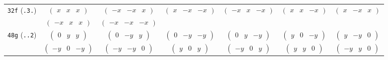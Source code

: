 \documentclass[fleqn,9pt,landscape]{jsarticle}
\begin{document}
\begin{center}
\begin{longtable}{ccccccc}
{\tt 32f} ({\tt .3.}) & $ \begin{pmatrix} x & x & x \end{pmatrix} $ & $ \begin{pmatrix} - x & - x & x \end{pmatrix} $ & $ \begin{pmatrix} x & - x & - x \end{pmatrix} $ & $ \begin{pmatrix} - x & x & - x \end{pmatrix} $ & $ \begin{pmatrix} x & x & - x \end{pmatrix} $ & $ \begin{pmatrix} x & - x & x \end{pmatrix} $ \\
& $ \begin{pmatrix} - x & x & x \end{pmatrix} $ & $ \begin{pmatrix} - x & - x & - x \end{pmatrix} $ & $  $ & $  $ & $  $ & $  $ \\ \hline
{\tt 48g} ({\tt ..2}) & $ \begin{pmatrix} 0 & y & y \end{pmatrix} $ & $ \begin{pmatrix} 0 & - y & y \end{pmatrix} $ & $ \begin{pmatrix} 0 & - y & - y \end{pmatrix} $ & $ \begin{pmatrix} 0 & y & - y \end{pmatrix} $ & $ \begin{pmatrix} y & 0 & - y \end{pmatrix} $ & $ \begin{pmatrix} y & - y & 0 \end{pmatrix} $ \\
& $ \begin{pmatrix} - y & 0 & - y \end{pmatrix} $ & $ \begin{pmatrix} - y & - y & 0 \end{pmatrix} $ & $ \begin{pmatrix} y & 0 & y \end{pmatrix} $ & $ \begin{pmatrix} - y & 0 & y \end{pmatrix} $ & $ \begin{pmatrix} y & y & 0 \end{pmatrix} $ & $ \begin{pmatrix} - y & y & 0 \end{pmatrix} $ \\ \hline

\end{longtable}
\end{center}
\end{document}

